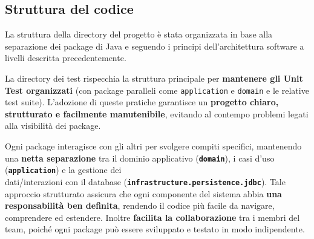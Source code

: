 \documentclass[a4paper,11pt]{article}
\begin{document}
\newpage

\subsection{Struttura del codice}

La struttura della directory del progetto è stata organizzata in base alla separazione dei package di Java e seguendo i principi dell'architettura software a livelli descritta precedentemente.

\begin{figure}[H]
\end{figure}

La directory dei test rispecchia la struttura principale per \textbf{mantenere gli Unit Test organizzati} (con package paralleli come \texttt{application} e \texttt{domain} e le relative test suite). L'adozione di queste pratiche garantisce un \textbf{progetto chiaro, strutturato e facilmente manutenibile}, evitando al contempo problemi legati alla visibilità dei package.

Ogni package interagisce con gli altri per svolgere compiti specifici, mantenendo una \textbf{netta separazione} tra il dominio applicativo (\textbf{\texttt{domain}}), i casi d'uso (\textbf{\texttt{application}}) e la gestione dei \\ dati/interazioni con il database (\textbf{\texttt{infrastructure.persistence.jdbc}}). Tale approccio strutturato assicura che ogni componente del sistema abbia \textbf{una responsabilità ben definita}, rendendo il codice più facile da navigare, comprendere ed estendere. Inoltre \textbf{facilita la collaborazione} tra i membri del team, poiché ogni package può essere sviluppato e testato in modo indipendente.

\newpage
\end{document}
